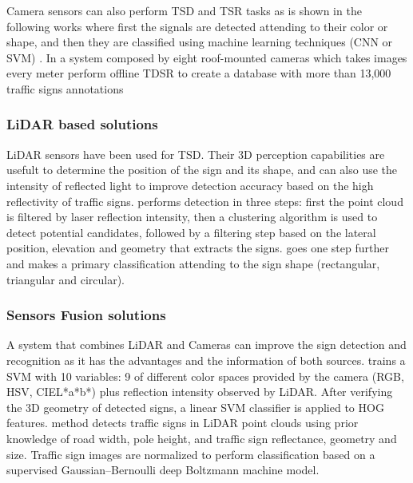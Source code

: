 \documentclass[journal]{IEEEtran}
\begin{document}
Camera sensors can also perform TSD and TSR tasks as is 
shown in the following works where first the signals are detected attending to
their color or shape, and then they are classified using machine learning techniques (CNN or SVM)
\cite{miyata2017automatic, yang2016towards, wali2015automatic}. In \cite{timofte2014multi}
a system composed by eight roof-mounted cameras which takes images every meter
perform offline TDSR to create a database with more than 13,000 traffic signs annotations


\subsubsection{LiDAR based solutions}
LiDAR sensors have been used for TSD. Their 3D perception capabilities are 
usefult to determine the position of the sign and its shape, and can also use 
the intensity of reflected light to improve detection accuracy based on the
high reflectivity of traffic signs. \cite{gargoum2017automated} 
performs detection in three steps: first the point cloud is filtered by 
laser reflection intensity, then a clustering algorithm is used to detect 
potential candidates, followed by a filtering step based on the lateral 
position, elevation and geometry that extracts the signs. 
\cite{weng2016road} goes one step further and makes a primary 
classification attending to the sign shape (rectangular, triangular and 
circular).

\subsubsection{Sensors Fusion solutions}
A system that combines LiDAR and Cameras can improve the sign detection and 
recognition as it has the advantages and the information of both sources. 
\cite{zhou2014lidar} trains a SVM with 10 variables: 9 of different color 
spaces provided by the camera (RGB, HSV, CIEL*a*b*) plus reflection intensity 
observed by LiDAR. After verifying the 3D geometry of detected signs, a linear
SVM classifier is applied to HOG features.
\cite{guan2018robust} method detects traffic signs in LiDAR point clouds
using prior knowledge of road width, pole height, and traffic sign reflectance, 
geometry and size. Traffic sign images are normalized to perform classification 
based on a supervised Gaussian–Bernoulli deep Boltzmann machine model.
\end{document}
